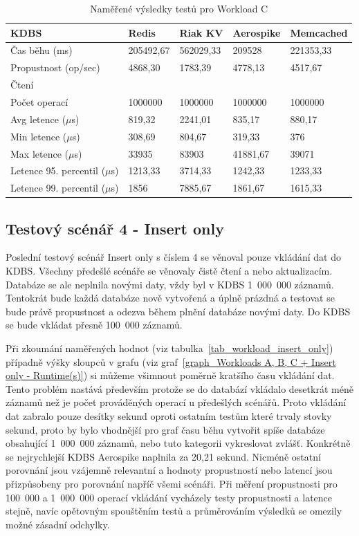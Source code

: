 \documentclass[czech,master,dept460,male,csharp,cpdeclaration]{diploma}
\begin{document}
	\begin{table}
		\centering
		\begin{tabular}{ l | l l l l }
			\toprule
			KDBS & Redis & Riak KV & Aerospike & Memcached \\
			\midrule
			Čas běhu (ms) & 205492,67 & 562029,33 & 209528 & 221353,33 \\
			Propustnost (op/sec) & 4868,30 & 1783,39 & 4778,13 & 4517,67 \\
			\midrule
			\multicolumn{5}{l}{Čtení} \\
			Počet operací & 1000000 & 1000000 & 1000000 & 1000000 \\
			Avg letence ($\mu$s) & 819,32 & 2241,01 & 835,17 & 880,17 \\
			Min letence ($\mu$s) & 308,69 & 804,67 & 319,33 & 376 \\
			Max letence ($\mu$s) & 33935 & 83903 & 41881,67 & 39071 \\
			Letence 95. percentil ($\mu$s) & 1213,33 & 3714,33 & 1242,33 & 1233,33 \\
			Letence 99. percentil ($\mu$s) & 1856 & 7885,67 & 1861,67 & 1615,33 \\
			\bottomrule
		\end{tabular}
		\caption{Naměřené výsledky testů pro Workload C\label{tab_workload_c}}
	\end{table}
	
	\subsection{Testový scénář 4 - Insert only} 
	
	Poslední testový scénář Insert only s číslem 4 se věnoval pouze vkládání dat do KDBS. Všechny předešlé scénáře se věnovaly čistě čtení a nebo aktualizacím. Databáze se ale neplnila novými daty, vždy byl v KDBS 1~000~000 záznamů. Tentokrát bude každá databáze nově vytvořená a úplně prázdná a testovat se bude právě propustnost a odezva během plnění databáze novými daty. Do KDBS se bude vkládat přesně 100~000 záznamů.
	
	Při zkoumání naměřených hodnot (viz tabulka~\ref{tab_workload_insert_only}) případně výšky sloupců v grafu (viz graf~\ref{graph_Workloads A, B, C + Insert only - Runtime(s)}) si můžeme všimnout poměrně kratšího času vkládání dat. Tento problém nastává především protože se do databází vkládalo desetkrát méně záznamů než je počet prováděných operací u předešlých scénářů. Proto vkládání dat zabralo pouze desítky sekund oproti ostatním testům které trvaly stovky sekund, proto by bylo vhodnější pro graf času běhu vytvořit spíše databáze obsahující 1~000~000 záznamů, nebo tuto kategorii vykreslovat zvlášť. Konkrétně se nejrychlejší KDBS Aerospike naplnila za 20,21 sekund. Nicméně ostatní porovnání jsou vzájemně relevantní a hodnoty propustností nebo latencí jsou přizpůsobeny pro porovnání napříč všemi scénáři. Při měření propustnosti pro 100~000 a 1~000~000 operací vkládání vycházely testy propustnosti a latence stejně, navíc opětovným spouštěním testů a průměrováním výsledků se omezily možné zásadní odchylky. 
	
\end{document}
